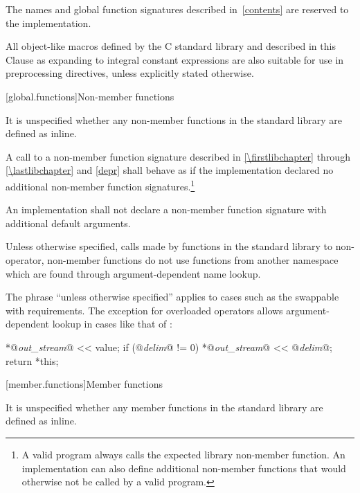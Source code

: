 \pnum
The names and global function signatures described in~\ref{contents} are
reserved to the implementation.
%
%
%
%
%

\pnum
All object-like macros defined by the C standard library and described in this
Clause as expanding to integral constant expressions are also suitable for use
in  preprocessing directives, unless
explicitly stated otherwise.

[global.functions]{Non-member functions}

\pnum
It is unspecified whether any
non-member
functions in the \Cpp{} standard library are defined as
inline.

\pnum
A call to a non-member function signature
described in \ref{\firstlibchapter} through \ref{\lastlibchapter} and
\ref{depr} shall behave as if the implementation declared no additional
non-member function signatures.\footnote{A valid \Cpp{} program always
calls the expected library non-member function. An implementation can
also define additional non-member functions that would otherwise not
be called by a valid \Cpp{} program.}

\pnum
An implementation shall not declare a non-member function signature
with additional default arguments.

\pnum
Unless otherwise specified,
calls made by functions in the standard library to non-operator, non-member functions
do not use functions from another namespace which are found through
argument-dependent name lookup.
\begin{note}
The phrase ``unless otherwise specified'' applies to cases such as
the swappable with requirements.
The exception for overloaded operators allows argument-dependent lookup
in cases like that of
:

\effects
\begin{codeblock}
*@\textit{out_stream}@ << value;
if (@\textit{delim}@ != 0)
  *@\textit{out_stream}@ << @\textit{delim}@;
return *this;
\end{codeblock}
\end{note}

[member.functions]{Member functions}

\pnum
It is unspecified whether any member functions in the \Cpp{} standard library are defined as
inline.


